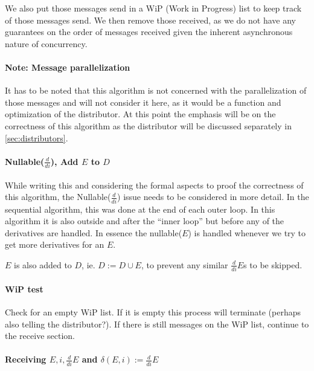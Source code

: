 \documentclass[a4paper,11pt]{report}
\begin{document}
We also put those messages send in a WiP (Work in Progress) list to
keep track of those messages send. We then remove those received, as
we do not have any guarantees on the order of messages received given
the inherent asynchronous nature of concurrency.

\paragraph{Note: Message parallelization}
\label{sec:note:-mess-parall}

It has to be noted that this algorithm is not concerned with the
parallelization of those messages and will not consider it here, as it
would be a function and optimization of the distributor. At this point
the emphasis will be on the correctness of this algorithm as the
distributor will be discussed separately in \autoref{sec:distributors}.

\paragraph{Nullable($\frac{d}{di}$), Add $E$ to $D$}
\label{sec:nullablefracddi}

While writing this and considering the formal aspects to proof the
correctness of this algorithm, the Nullable($\frac{d}{di}$) issue
needs to be considered in more detail. In the sequential algorithm,
this was done at the end of each outer loop. In this algorithm it is
also outside and after the ``inner loop'' but before any of the
derivatives are handled. In essence the nullable($E$) is handled
whenever we try to get more derivatives for an $E$.

$E$ is also added to $D$, ie. $D:=D\cup {E}$, to prevent any similar
$\frac{d}{di}E$s to be skipped.

\paragraph{WiP test}
\label{sec:wip-test}

Check for an empty WiP list. If it is empty this process will
terminate (perhaps also telling the distributor?).  If there is still
messages on the WiP list, continue to the receive section.

\paragraph{Receiving ${E,i,\frac{d}{di}E}$ and $\delta(E,i):=\frac{d}{di}E$}
\label{sec:receiving-e-i}
\end{document}
